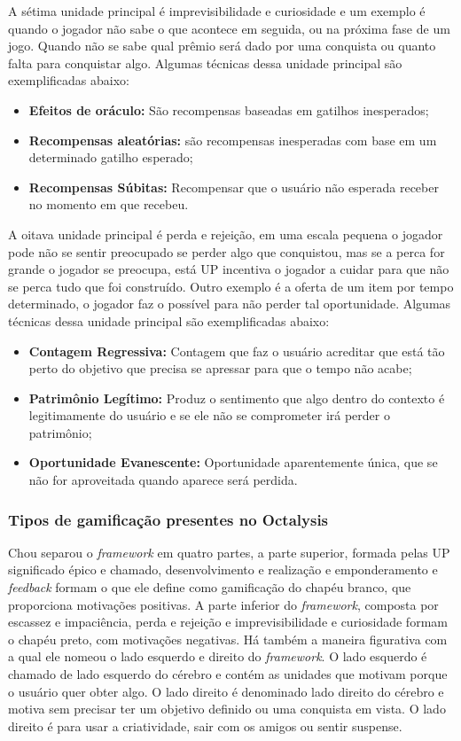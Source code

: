 A sétima unidade principal é imprevisibilidade e curiosidade e um exemplo é quando o jogador não sabe o que acontece em seguida, ou na próxima fase de um jogo. Quando não se sabe qual prêmio será dado por uma conquista ou quanto falta para conquistar algo. Algumas técnicas dessa unidade principal são exemplificadas abaixo:

\begin{itemize}
\item  \textbf{Efeitos de oráculo:} São recompensas baseadas em gatilhos inesperados;
\item  \textbf{Recompensas aleatórias:} são recompensas inesperadas com base em um determinado gatilho esperado;
\item  \textbf{Recompensas Súbitas:} Recompensar que o usuário não esperada receber no momento em que recebeu.
\end{itemize}

A oitava unidade principal é perda e rejeição, em uma escala pequena o jogador pode não se sentir preocupado se perder algo que conquistou, mas se a perca for grande o jogador se preocupa, está UP incentiva o jogador a cuidar para que não se perca tudo que foi construído. Outro exemplo é a oferta de um item por tempo determinado, o jogador faz o possível para não perder tal oportunidade. Algumas técnicas dessa unidade principal são exemplificadas abaixo:

\begin{itemize}
\item  \textbf{Contagem Regressiva:} Contagem que faz o usuário acreditar que está tão perto do objetivo que precisa se apressar para que o tempo não acabe;
\item  \textbf{Patrimônio Legítimo:} Produz o sentimento que algo dentro do contexto é legitimamente do usuário e se ele não se comprometer irá perder o patrimônio;
\item  \textbf{Oportunidade Evanescente:} Oportunidade aparentemente única, que se não for aproveitada quando aparece será perdida.
\end{itemize}

\subsubsection{Tipos de gamificação presentes no Octalysis}

Chou separou o \textit{framework} em quatro partes, a parte superior, formada pelas UP significado épico e chamado, desenvolvimento e realização e emponderamento e \textit{feedback} formam o que ele define como gamificação do chapéu branco, que proporciona motivações positivas. A parte inferior do \textit{framework}, composta por escassez e impaciência, perda e rejeição e imprevisibilidade e curiosidade formam o chapéu preto, com motivações negativas. Há também a maneira figurativa com a qual ele nomeou o lado esquerdo e direito do \textit{framework}. O lado esquerdo é chamado de lado esquerdo do cérebro e contém as unidades que motivam porque o usuário quer obter algo. O lado direito é denominado lado direito do cérebro e motiva sem precisar ter um objetivo definido ou uma conquista em vista. O lado direito é para usar a criatividade, sair com os amigos ou sentir suspense.

